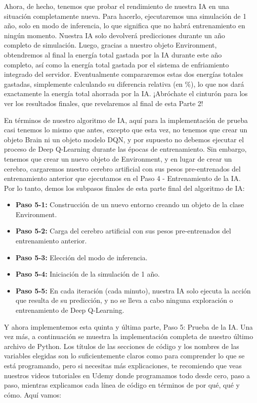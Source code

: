 \documentclass[
]{book}
\providecommand{\tightlist}{%
  \setlength{\itemsep}{0pt}\setlength{\parskip}{0pt}}
\begin{document}
Ahora, de hecho, tenemos que probar el rendimiento de nuestra IA en una situación completamente nueva. Para hacerlo, ejecutaremos una simulación de 1 año, solo en modo de inferencia, lo que significa que no habrá entrenamiento en ningún momento. Nuestra IA solo devolverá predicciones durante un año completo de simulación. Luego, gracias a nuestro objeto Environment, obtendremos al final la energía total gastada por la IA durante este año completo, así como la energía total gastada por el sistema de enfriamiento integrado del servidor. Eventualmente compararemos estas dos energías totales gastadas, simplemente calculando su diferencia relativa (en \%), lo que nos dará exactamente la energía total ahorrada por la IA. ¡Abróchate el cinturón para los ver los resultados finales, que revelaremos al final de esta Parte 2!

En términos de nuestro algoritmo de IA, aquí para la implementación de prueba casi tenemos lo mismo que antes, excepto que esta vez, no tenemos que crear un objeto Brain ni un objeto modelo DQN, y por supuesto no debemos ejecutar el proceso de Deep Q-Learning durante las épocas de entrenamiento. Sin embargo, tenemos que crear un nuevo objeto de Environment, y en lugar de crear un cerebro, cargaremos nuestro cerebro artificial con sus pesos pre-entrenados del entrenamiento anterior que ejecutamos en el Paso 4 - Entrenamiento de la IA. Por lo tanto, demos los subpasos finales de esta parte final del algoritmo de IA:

\begin{itemize}
\tightlist
\item
  \textbf{Paso 5-1:} Construcción de un nuevo entorno creando un objeto de la clase Environment.
\item
  \textbf{Paso 5-2:} Carga del cerebro artificial con sus pesos pre-entrenados del entrenamiento anterior.
\item
  \textbf{Paso 5-3:} Elección del modo de inferencia.
\item
  \textbf{Paso 5-4:} Iniciación de la simulación de 1 año.
\item
  \textbf{Paso 5-5:} En cada iteración (cada minuto), nuestra IA solo ejecuta la acción que resulta de su predicción, y no se lleva a cabo ninguna exploración o entrenamiento de Deep Q-Learning.
\end{itemize}

Y ahora implementemos esta quinta y última parte, Paso 5: Prueba de la IA. Una vez más, a continuación se muestra la implementación completa de nuestro último archivo de Python. Los títulos de las secciones de código y los nombres de las variables elegidas son lo suficientemente claros como para comprender lo que se está programando, pero si necesitas más explicaciones, te recomiendo que veas nuestros videos tutoriales en Udemy donde programamos todo desde cero, paso a paso, mientras explicamos cada línea de código en términos de por qué, qué y cómo. Aquí vamos:
\end{document}
